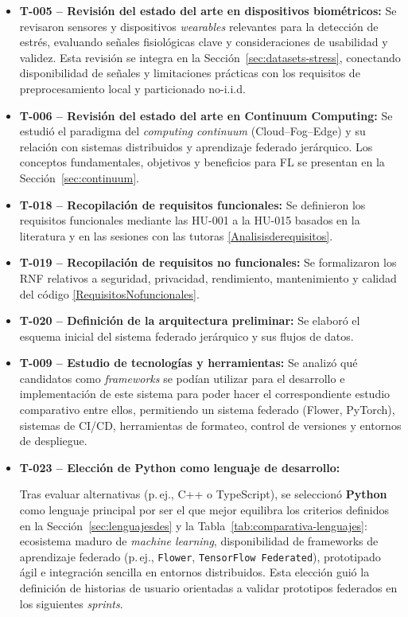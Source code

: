 \documentclass{report}
\begin{document}
\begin{itemize}
  

\item \textbf{T-005 – Revisión del estado del arte en dispositivos biométricos:}  
Se revisaron sensores y dispositivos \textit{wearables} relevantes para la detección de estrés, evaluando señales fisiológicas clave y consideraciones de usabilidad y validez.  
Esta revisión se integra en la Sección~\ref{sec:datasets-stress}, conectando disponibilidad de señales y limitaciones prácticas con los requisitos de preprocesamiento local y particionado no-i.i.d.


    
  \item \textbf{T-006 – Revisión del estado del arte en Continuum Computing:}  
Se estudió el paradigma del \textit{computing continuum} (Cloud--Fog--Edge) y su relación con sistemas distribuidos y aprendizaje federado jerárquico.  
Los conceptos fundamentales, objetivos y beneficios para FL se presentan en la Sección~\ref{sec:continuum}.

  \item \textbf{T-018 – Recopilación de requisitos funcionales:}  
  Se definieron los requisitos funcionales mediante las HU-001 a la HU-015 basados en la literatura y en las sesiones con las tutoras \ref{Analisisderequisitos}.

  \item \textbf{T-019 – Recopilación de requisitos no funcionales:}  
  Se formalizaron los RNF relativos a seguridad, privacidad, rendimiento, mantenimiento y calidad del código \ref{RequisitosNofuncionales}.

  \item \textbf{T-020 – Definición de la arquitectura preliminar:}  
  Se elaboró el esquema inicial del sistema federado jerárquico y sus flujos de datos.

  \item \textbf{T-009 – Estudio de tecnologías y herramientas:}  
  Se analizó qué candidatos como \textit{frameworks} se podían utilizar para el desarrollo e implementación de este sistema para poder hacer el correspondiente estudio comparativo entre ellos, permitiendo un sistema federado (Flower, PyTorch), sistemas de CI/CD, herramientas de formateo, control de versiones y entornos de despliegue.

\item \textbf{T-023 – Elección de Python como lenguaje de desarrollo:}  

Tras evaluar alternativas (p.\,ej., C++ o TypeScript), se seleccionó \textbf{Python} como lenguaje principal por ser el que mejor equilibra los criterios definidos en la Sección~\ref{sec:lenguajesdes} y la Tabla~\ref{tab:comparativa-lenguajes}: ecosistema maduro de \textit{machine learning}, disponibilidad de frameworks de aprendizaje federado (p.\,ej., \texttt{Flower}, \texttt{TensorFlow Federated}), prototipado ágil e integración sencilla en entornos distribuidos. Esta elección guió la definición de historias de usuario orientadas a validar prototipos federados en los siguientes \textit{sprints}.



\end{itemize}
\end{document}
